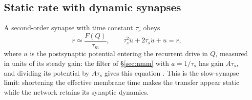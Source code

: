 \subsection{Static rate with dynamic synapses}
A second-order synapse with time constant $\tau_s$ obeys
\begin{equation}
r\simeq \frac{F(Q)}{\tau_m},\qquad
\tau_s^2\ddot u+2\tau_s\dot u+u=r,
\label{eq:slow_synapse}
\end{equation}
where $u$ is the postsynaptic potential entering the recurrent drive in $Q$, measured in
units of its steady gain: the filter of \S\ref{sec:nmm} with $a=1/\tau_s$ has gain
$A\tau_s$, and dividing its potential by $A\tau_s$ gives this equation \cite{clusella2023}. This is the slow-synapse limit: shortening the
effective membrane time makes the transfer appear static while the network retains
its synaptic dynamics.
